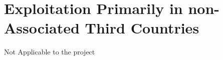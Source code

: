 
%

\clearpage
\section{Exploitation Primarily in non-Associated Third Countries}
Not Applicable to the project